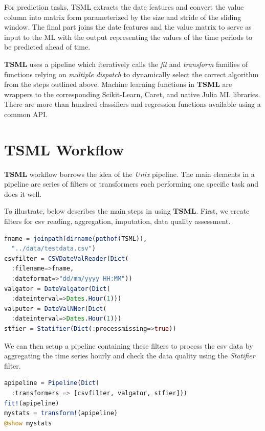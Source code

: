 \documentclass{juliacon}
\begin{document}
\vskip 6pt

For prediction tasks, TSML extracts the date features and 
convert the value column into matrix form parameterized by 
the size and stride of the sliding window. The final part joins
 the date features and the value matrix to serve as input to the 
 ML with the output representing the values of the time periods 
 to be predicted ahead of time.
 
 \vskip 6pt
 
\textbf{TSML} uses a pipeline which iteratively calls the \emph{fit} and \emph{transform}
families of functions relying on \emph{multiple dispatch} to dynamically select the correct algorithm from the steps outlined above. Machine learning functions in 
\textbf{TSML} are wrappers to the corresponding Scikit-Learn, Caret, and native Julia ML libraries. 
There are more than hundred classifiers and regression functions available using a common API.

\section{TSML Workflow}
\label{sec:tsmlworkflow}
%
\textbf{TSML} workflow borrows the idea of the  \emph{Unix} pipeline\cite{orchestra2014, combineml2016}. The main elements in a pipeline are series of filters or transformers each performing one specific task and does it well. 

\vskip 6pt
To illustrate, below describes the main steps in using \textbf{TSML}.
First, we create filters for csv reading, aggregation, imputation, data quality
assessment.

\begin{lstlisting}[language = Julia]
fname = joinpath(dirname(pathof(TSML)),
  "../data/testdata.csv")
csvfilter = CSVDateValReader(Dict(
  :filename=>fname,
  :dateformat=>"dd/mm/yyyy HH:MM"))
valgator = DateValgator(Dict(
  :dateinterval=>Dates.Hour(1)))
valputer = DateValNNer(Dict(
  :dateinterval=>Dates.Hour(1)))
stfier = Statifier(Dict(:processmissing=>true))
\end{lstlisting}

We can then setup a pipeline containing these filters to process the csv data
by aggregating the time series hourly and check the data quality using the
\emph{Statifier} filter.

\begin{lstlisting}[language = Julia]
apipeline = Pipeline(Dict(
  :transformers => [csvfilter, valgator, stfier]))
fit!(apipeline)
mystats = transform!(apipeline)
@show mystats
\end{lstlisting}
\end{document}
